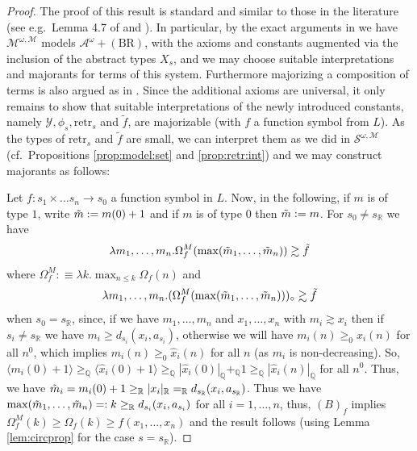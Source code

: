 \documentclass[11pt]{amsart}
\theoremstyle{definition}
\theoremstyle{remark}
\def\QQ{\mathbb{Q}}
\def\RR{\mathbb{R}}
\begin{document}
\begin{proof}
    The proof of this result is standard and similar to those in the literature (see e.g.\ Lemma 4.7 of \cite{kohlenbach2005some} and \cite{Kohlenbach2008}). In particular, by the exact arguments in \cite{Kohlenbach2008} we have $\mathcal{M}^{\omega,\mathscr{M}}$ models $\mathcal{A}^\omega + (\mathrm{BR})$, with the axioms and constants augmented via the inclusion of the abstract types $X_s$, and we may choose suitable interpretations and majorants for terms of this system. Furthermore majorizing a composition of terms is also argued as in \cite{Kohlenbach2008}. Since the additional axioms are universal, it only remains to show that suitable interpretations of the newly introduced constants, namely $\mathscr{Y}, \phi_s, \mathrm{retr}_s$ and $\tilde{f}$, are majorizable (with $f$ a function symbol from $L$). As the types of $\mathrm{retr}_s$ and $\tilde{f}$ are small, we can interpret them as we did in $\mathcal{S}^{\omega,\mathscr{M}}$ (cf.\ Propositions \ref{prop:model:set} and \ref{prop:retr:int}) and we may construct majorants as follows: 
   
   Let $f:s_1 \times \ldots s_n \to s_0 $ a function symbol in $L$. Now, in the following, if $m$ is of type $1$, write $\Tilde{m}:=m(0)+1$ and if $m$ is of type $0$ then $\Tilde{m}:= m$. For $s_0\neq s_\RR$ we have 
\[
\lambda m_1,\ldots,m_n.\Omega^M_f(\max(\Tilde{m}_1,\ldots,\Tilde{m}_n))\gtrsim \tilde{f}
\]
where $\Omega^M_f:\equiv \lambda k. \max_{n\le k}\Omega_f(n)$ and 
\[
\lambda m_1,\ldots,m_n.(\Omega^M_f(\max(\Tilde{m}_1,\ldots,\Tilde{m}_n)))_\circ\gtrsim \tilde{f}
\]
when $s_0=s_\RR$, since, if we have $m_1,\ldots,m_n$ and $x_1,\ldots,x_n$ with $m_i \gtrsim x_i$ then if $s_i \neq s_\RR$ we have $m_i \ge d_{s_i}(x_i,a_{s_i})$, otherwise we will have $m_i(n) \ge_0 x_i(n)$ for all $n^0$, which implies $m_i(n) \ge_0 \hat{x}_i(n)$ for all $n$ (as $m_i$ is non-decreasing). So, $\langle m_i(0)+1\rangle \ge_\QQ \langle \hat{x}_i(0) +1\rangle  \ge_\QQ |\hat{x}_i(0)|_\QQ +_\QQ 1 \ge _\QQ |\hat{x}_i(n)|_\QQ$ for all $n^0$. Thus, we have $\Tilde{m}_i=m_i(0)+1 \ge_\RR |x_i|_\RR=_\RR d_{s_\RR}(x_i,a_{s_\RR})$. Thus we have $\max(\Tilde{m}_1,\ldots,\Tilde{m}_n)=:k \ge_\RR d_{s_i}(x_i,a_{s_i})$ for all $i=1,\ldots,n$, thus, $(B)_f$ implies $\Omega^M_f(k)\ge \Omega_f(k) \ge f(x_1,\ldots,x_n)$ and the result follows (using Lemma \ref{lem:circprop} for the case $s=s_\RR$). 


\end{proof}
\end{document}
